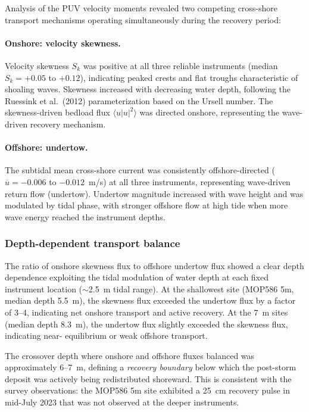 Analysis of the PUV velocity moments revealed two competing
cross-shore transport mechanisms operating simultaneously during the
recovery period:

\paragraph{Onshore: velocity skewness.}
Velocity skewness $S_k$ was positive at all three reliable instruments
(median $S_k = +0.05$ to $+0.12$), indicating peaked crests and flat
troughs characteristic of shoaling waves. Skewness increased with
decreasing water depth, following the Ruessink et al.\ (2012)
parameterization based on the Ursell number. The skewness-driven
bedload flux $\langle u |u|^2 \rangle$ was directed onshore,
representing the wave-driven recovery mechanism.

\paragraph{Offshore: undertow.}
The subtidal mean cross-shore current was consistently offshore-directed
($\overline{u} = -0.006$ to $-0.012$~m/s) at all three instruments,
representing wave-driven return flow (undertow). Undertow magnitude
increased with wave height and was modulated by tidal phase, with
stronger offshore flow at high tide when more wave energy reached the
instrument depths.

\subsubsection{Depth-dependent transport balance}

The ratio of onshore skewness flux to offshore undertow flux showed a
clear depth dependence exploiting the tidal modulation of water depth
at each fixed instrument location ($\sim$2.5~m tidal range). At the
shallowest site (MOP586 5m, median depth 5.5~m), the skewness flux
exceeded the undertow flux by a factor of 3--4, indicating net onshore
transport and active recovery. At the 7~m sites (median depth 8.3~m),
the undertow flux slightly exceeded the skewness flux, indicating near-
equilibrium or weak offshore transport.

The crossover depth where onshore and offshore fluxes balanced
was approximately 6--7~m, defining a \emph{recovery boundary} below
which the post-storm deposit was actively being redistributed
shoreward. This is consistent with the survey observations: the
MOP586 5m site exhibited a 25~cm recovery pulse in mid-July 2023 that
was not observed at the deeper instruments.

